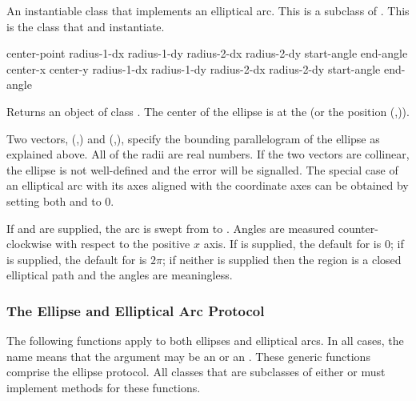 An instantiable class that implements an elliptical arc.  This is a subclass of
.  This is the class that  and
 instantiate.
\Immutable

  {center-point
                               radius-1-dx radius-1-dy radius-2-dx radius-2-dy
                               \key start-angle end-angle}
 {center-x center-y 
                               radius-1-dx radius-1-dy radius-2-dx radius-2-dy
                               \key start-angle end-angle}

Returns an object of class .  The center of the
ellipse is at the   (or the position
(,)).

Two vectors, (,) and
(,), specify the bounding parallelogram of the
ellipse as explained above.  All of the radii are real numbers.   If the two
vectors are collinear, the ellipse is not well-defined and the
 error will be signalled.  The special case of
an elliptical arc with its axes aligned with the coordinate axes can be obtained
by setting both  and  to 0.

If  and  are supplied, the arc is swept from
 to .  Angles are measured counter-clockwise
with respect to the positive $x$ axis.  If  is supplied, the
default for  is $0$; if  is supplied, the
default for  is $2\pi$; if neither is supplied then the region is
a closed elliptical path and the angles are meaningless.

\MayCaptureInputs


\subsubsection {The Ellipse and Elliptical Arc Protocol}

The following functions apply to both ellipses and elliptical arcs.  In all
cases, the name  means that the argument may be an
 or an .  These generic functions comprise
the ellipse protocol.  All classes that are subclasses of either  or
 must implement methods for these functions.

